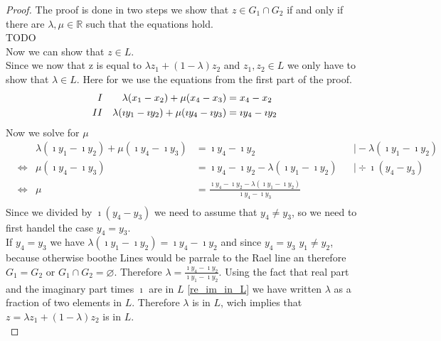 \begin{proof}
    The proof is done in two steps we show that $z \in G_1 \cap G_2$ if and only if there are $\lambda, \mu \in \mathbb{R}$ such that the equations hold. \\
    TODO \\%

    Now we can show that $z \in L$.\\
    Since we now that z is equal to $\lambda z_1 + (1-\lambda)z_2$ and $z_1, z_2 \in L$ we only have to show that $\lambda \in L$. Here for we use the equations from the first part of the proof.
    \begin{align*}
        \RNum{1} &&\lambda(x_1 - x_2)+\mu(x_4-x_3) &= x_4-x_2\\
        \RNum{2} &&\lambda(\imath y_1 - \imath y_2)+\mu(\imath y_4-\imath y_3) &= \imath y_4-\imath y_2
    \end{align*}
    Now we solve  for $\mu$ 
    \begin{align*}
        && \lambda(\imath y_1 - \imath y_2)+\mu(\imath y_4-\imath y_3) &= \imath y_4-\imath y_2 && \mid -\lambda(\imath y_1 - \imath y_2)\\
        &\Leftrightarrow & \mu(\imath y_4-\imath y_3) &= \imath y_4-\imath y_2 - \lambda(\imath y_1 - \imath y_2) && \mid \div \imath(y_4-y_3)\\
        &\Leftrightarrow & \mu &= \frac{\imath y_4-\imath y_2 - \lambda(\imath y_1 - \imath y_2)}{\imath y_4-\imath y_3}\\
    \end{align*}
    Since we divided by $\imath (y_4-y_3)$ we need to assume that $y_4 \ne y_3$, so we need to first handel the case $y_4 = y_3$.\\
    If $y_4 = y_3$ we have $\lambda(\imath y_1 - \imath y_2) = \imath y_4-\imath y_2$ and since $y_4 = y_3$ $y_1 \ne y_2$, because otherwise boothe Lines would be parrale to the Rael line an therefore $G_1 = G_2$ or $G_1 \cap G_2 = \varnothing$. Therefore $\lambda = \frac{\imath y_4-\imath y_2}{\imath y_1 - \imath y_2}$. Using the fact that real part and the imaginary part times $\imath$ are in $L$ \ref{re_im_in_L} we have written $\lambda$ as a fraction of two elements in $L$. Therefore $\lambda$ is in $L$, wich implies that $z = \lambda z_1 + (1-\lambda)z_2$ is in $L$.\\
   

\end{proof}
